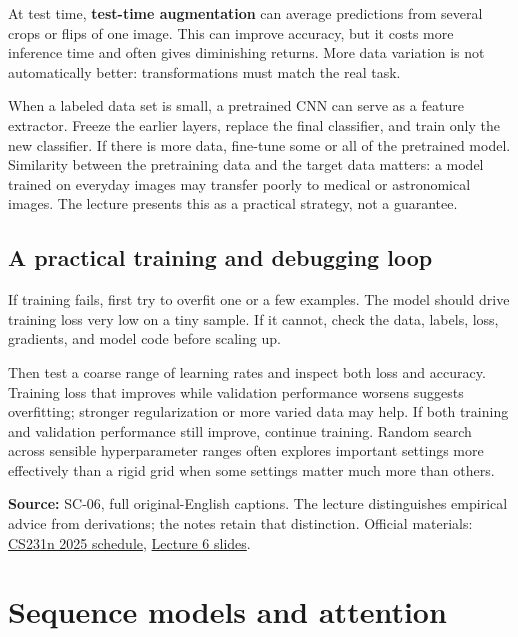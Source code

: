 At test time, \textbf{test-time augmentation} can average predictions from several crops or flips of one image. This can improve accuracy, but it costs more inference time and often gives diminishing returns. More data variation is not automatically better: transformations must match the real task.

When a labeled data set is small, a pretrained CNN can serve as a feature extractor. Freeze the earlier layers, replace the final classifier, and train only the new classifier. If there is more data, fine-tune some or all of the pretrained model. Similarity between the pretraining data and the target data matters: a model trained on everyday images may transfer poorly to medical or astronomical images. The lecture presents this as a practical strategy, not a guarantee.

\subsection{A practical training and debugging loop}\label{04-visual-computing-ii-ch031-a-practical-training-and-debugging-loop}

If training fails, first try to overfit one or a few examples. The model should drive training loss very low on a tiny sample. If it cannot, check the data, labels, loss, gradients, and model code before scaling up.

Then test a coarse range of learning rates and inspect both loss and accuracy. Training loss that improves while validation performance worsens suggests overfitting; stronger regularization or more varied data may help. If both training and validation performance still improve, continue training. Random search across sensible hyperparameter ranges often explores important settings more effectively than a rigid grid when some settings matter much more than others.

\textbf{Source:} SC-06, full original-English captions. The lecture distinguishes empirical advice from derivations; the notes retain that distinction. Official materials: \href{https://cs231n.stanford.edu/2025/schedule.html}{CS231n 2025 schedule}, \href{https://cs231n.stanford.edu/slides/2025/lecture_6.pdf}{Lecture 6 slides}.

\section{Sequence models and attention}\label{04-visual-computing-ii-ch031-sequence-models-and-attention}

